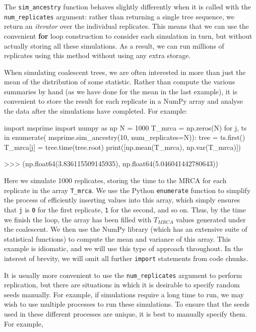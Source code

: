 \documentclass[graybox]{svmult}
\begin{document}
The
\texttt{sim\_ancestry} function behaves slightly differently when it is
called with the \texttt{num\_replicates} argument: rather than returning
a single tree sequence, we return an \emph{iterator} over the individual
replicates. This means that we can use the
convenient \textbf{for} loop construction to consider each simulation in
turn, but without actually storing all these simulations. As a result,
we can run millions of replicates using this method without
using any extra storage.

When simulating coalescent trees, we are often interested in more than
just the mean of the distribution of some statistic. Rather than compute
the various summaries by hand (as we have done for the mean in the last
example), it is convenient to store the result for each
replicate in a NumPy array and analyse the data after the simulations have completed.
For example:

\begin{pythoncode}
import msprime
import numpy as np
N = 1000
T_mrca = np.zeros(N)
for j, ts in enumerate(
        msprime.sim_ancestry(10, num_replicates=N)):
    tree = ts.first()
    T_mrca[j] = tree.time(tree.root)
print([np.mean(T_mrca), np.var(T_mrca)])

>>> (np.float64(3.836115509145935), np.float64(5.046041442780643))
\end{pythoncode}

    Here we simulate 1000 replicates, storing the time to the MRCA for each replicate in the array \texttt{T\_mrca}.  We use the Python \texttt{enumerate} function to simplify the process of efficiently inserting values into this
array, which simply ensures that \texttt{j} is \texttt{0} for the first replicate,
\texttt{1} for the second, and so on. Thus, by the time we finish the
loop, the array has been filled with $T_{MRCA}$ values generated
under the coalescent. We then use the NumPy library (which has
an extensive suite of statistical functions) to compute the mean and
variance of this array. This example is idiomatic, and we will use this
type of approach throughout. In the interest of brevity, we will omit all
further \texttt{import} statements from code chunks.

It is usually more convenient to use the \texttt{num\_replicates}
argument to perform replication, but there are situations in which it is
desirable to specify random seeds manually. For example, if simulations
require a long time to run, we may wish to use multiple processes to
run these simulations. To ensure that the seeds used in these different
processes are unique, it is best to manually specify them. For example,
\end{document}

